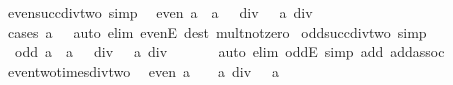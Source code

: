 \begin{isabellebody}
\isanewline
{}\isamarkupfalse%
\ even{\isacharunderscore}{\kern0pt}succ{\isacharunderscore}{\kern0pt}div{\isacharunderscore}{\kern0pt}two\ {\isacharbrackleft}{\kern0pt}simp{\isacharbrackright}{\kern0pt}{\isacharcolon}{\kern0pt}\isanewline
\ \ {\isachardoublequoteopen}even\ a\ {\isasymLongrightarrow}\ {\isacharparenleft}{\kern0pt}a\ {\isacharplus}{\kern0pt}\ {}{\isacharparenright}{\kern0pt}\ div\ {}\ {\isacharequal}{\kern0pt}\ a\ div\ {}{\isachardoublequoteclose}\isanewline
%
\isadelimproof
\ \ %
\endisadelimproof
%
\isatagproof
{}\isamarkupfalse%
\ {\isacharparenleft}{\kern0pt}cases\ {\isachardoublequoteopen}a\ {\isacharequal}{\kern0pt}\ {}{\isachardoublequoteclose}{\isacharparenright}{\kern0pt}\ {\isacharparenleft}{\kern0pt}auto\ elim{\isacharbang}{\kern0pt}{\isacharcolon}{\kern0pt}\ evenE\ dest{\isacharcolon}{\kern0pt}\ mult{\isacharunderscore}{\kern0pt}not{\isacharunderscore}{\kern0pt}zero{\isacharparenright}{\kern0pt}%
\endisatagproof
{\isafoldproof}%
%
\isadelimproof
\isanewline
%
\endisadelimproof
\isanewline
{}\isamarkupfalse%
\ odd{\isacharunderscore}{\kern0pt}succ{\isacharunderscore}{\kern0pt}div{\isacharunderscore}{\kern0pt}two\ {\isacharbrackleft}{\kern0pt}simp{\isacharbrackright}{\kern0pt}{\isacharcolon}{\kern0pt}\isanewline
\ \ {\isachardoublequoteopen}odd\ a\ {\isasymLongrightarrow}\ {\isacharparenleft}{\kern0pt}a\ {\isacharplus}{\kern0pt}\ {}{\isacharparenright}{\kern0pt}\ div\ {}\ {\isacharequal}{\kern0pt}\ a\ div\ {}\ {\isacharplus}{\kern0pt}\ {}{\isachardoublequoteclose}\isanewline
%
\isadelimproof
\ \ %
\endisadelimproof
%
\isatagproof
{}\isamarkupfalse%
\ {\isacharparenleft}{\kern0pt}auto\ elim{\isacharbang}{\kern0pt}{\isacharcolon}{\kern0pt}\ oddE\ simp\ add{\isacharcolon}{\kern0pt}\ add{\isachardot}{\kern0pt}assoc{\isacharparenright}{\kern0pt}%
\endisatagproof
{\isafoldproof}%
%
\isadelimproof
\isanewline
%
\endisadelimproof
\isanewline
{}\isamarkupfalse%
\ even{\isacharunderscore}{\kern0pt}two{\isacharunderscore}{\kern0pt}times{\isacharunderscore}{\kern0pt}div{\isacharunderscore}{\kern0pt}two{\isacharcolon}{\kern0pt}\isanewline
\ \ {\isachardoublequoteopen}even\ a\ {\isasymLongrightarrow}\ {}\ {\isacharasterisk}{\kern0pt}\ {\isacharparenleft}{\kern0pt}a\ div\ {}{\isacharparenright}{\kern0pt}\ {\isacharequal}{\kern0pt}\ a{\isachardoublequoteclose}\isanewline
%
\isadelimproof
\ \ %
\endisadelimproof
%
\isatagproof
{}\isamarkupfalse%

\end{isabellebody}
